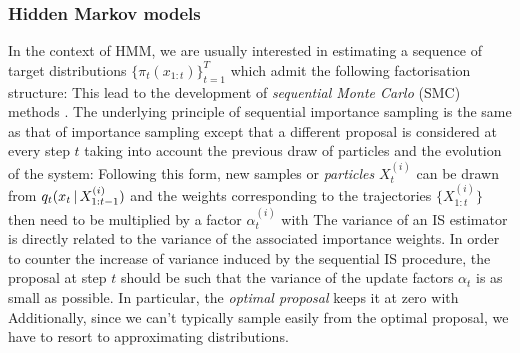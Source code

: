 \subsubsection{Hidden Markov models}
In the context of HMM, we are usually interested in estimating a sequence of target distributions $\{\pi_{t}(x_{1:t})\}_{t=1}^{T}$ which admit the following factorisation structure:
%
%
This lead to the development of \emph{sequential Monte Carlo} (SMC) methods \citep[chapter 14.3]{robert04}. The underlying principle of sequential importance sampling is the same as that of importance sampling except that a different proposal is considered at every step $t$ taking into account the previous draw of particles and the evolution of the system:
%
%
Following this form, new samples or \emph{particles} $X^{(i)}_t$ can be drawn from $q_{t}(x_{t}\,|\, X^{(i)}_{1:t-1})$ and the weights corresponding to the trajectories $\{X^{(i)}_{1:t}\}$ then need to be multiplied by a factor $\alpha^{(i)}_{t}$ with
%
%
The variance of an IS estimator is directly related to the variance of the associated importance weights. In order to counter the increase of variance induced by the sequential IS procedure, the proposal at step $t$ should be such that the variance of the update factors $\alpha_t$ is as small as possible. In particular, the \emph{optimal proposal} \citep{doucet11} keeps it at zero with
Additionally, since we can't typically sample easily from the optimal proposal, we have to resort to approximating distributions.

